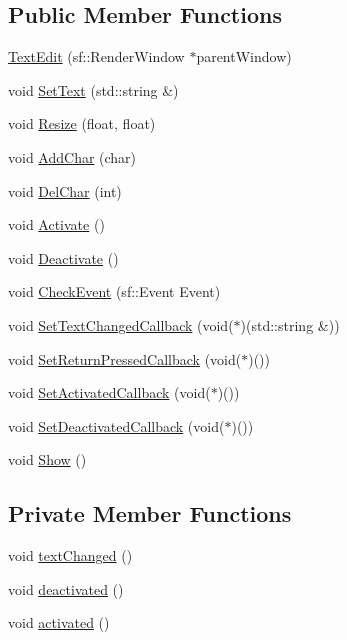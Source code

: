 \subsection*{Public Member Functions}
\begin{CompactItemize}
\item 
\hyperlink{classsfgui_1_1TextEdit_c6f2d938ccf876f05a9a9c47060c6093}{TextEdit} (sf::RenderWindow $\ast$parentWindow)
\item 
void \hyperlink{classsfgui_1_1TextEdit_16ffefa7f0c0d6e01275b8a2afa5975e}{SetText} (std::string \&)
\item 
void \hyperlink{classsfgui_1_1TextEdit_58afd20cc7cec80bf02603cc5e47143a}{Resize} (float, float)
\item 
void \hyperlink{classsfgui_1_1TextEdit_203952f38ce3bd68695597fee4b4397b}{AddChar} (char)
\item 
void \hyperlink{classsfgui_1_1TextEdit_dc95dab7bac1c41d0cebff1268f80c22}{DelChar} (int)
\item 
void \hyperlink{classsfgui_1_1TextEdit_bcd256e053ae8f13a5c7f919f79c03c9}{Activate} ()
\item 
void \hyperlink{classsfgui_1_1TextEdit_49b0919fd6c43c35913f8a46a6788270}{Deactivate} ()
\item 
void \hyperlink{classsfgui_1_1TextEdit_af6d4be3633d3eb8bcc7a1007e324da8}{CheckEvent} (sf::Event Event)
\item 
void \hyperlink{classsfgui_1_1TextEdit_2c80f417ea995a6452fcb47740701e1e}{SetTextChangedCallback} (void($\ast$)(std::string \&))
\item 
void \hyperlink{classsfgui_1_1TextEdit_b60f88cc667196bb073091e8878483f4}{SetReturnPressedCallback} (void($\ast$)())
\item 
void \hyperlink{classsfgui_1_1TextEdit_68bda298b3563eb960e77c3712664db8}{SetActivatedCallback} (void($\ast$)())
\item 
void \hyperlink{classsfgui_1_1TextEdit_6d75bcac8949d08513caa72e898e9b43}{SetDeactivatedCallback} (void($\ast$)())
\item 
void \hyperlink{classsfgui_1_1TextEdit_1ee03247816213b34caaff365b160de0}{Show} ()
\end{CompactItemize}
\subsection*{Private Member Functions}
\begin{CompactItemize}
\item 
void \hyperlink{classsfgui_1_1TextEdit_04bf790d96e0014479cc791691ecbade}{textChanged} ()
\item 
void \hyperlink{classsfgui_1_1TextEdit_c5ff761e3933294b46892db32e62b9f6}{deactivated} ()
\item 
void \hyperlink{classsfgui_1_1TextEdit_c009c601675801f2039d8f526e6fc921}{activated} ()
\end{CompactItemize}
